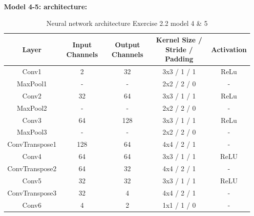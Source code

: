 \documentclass[a4paper,10pt]{article}
\begin{document}
\textbf{Model 4-5: architecture:}


\begin{table}[h]
\centering
\begin{tabular}{|c|c|c|c|c|}
\hline
\textbf{Layer} & \textbf{Input Channels} & \textbf{Output Channels} & \textbf{Kernel Size / Stride / Padding} & \textbf{Activation} \\ \hline
Conv1          & 2                       & 32                       & 3x3 / 1 / 1                             & ReLu                   \\ \hline
MaxPool1       & -                       & -                        & 2x2 / 2 / 0                             & -                   \\ \hline
Conv2          & 32                      & 64                       & 3x3 / 1 / 1                             & ReLu                   \\ \hline
MaxPool2       & -                       & -                        & 2x2 / 2 / 0                             & -                   \\ \hline
Conv3          & 64                      & 128                      & 3x3 / 1 / 1                             & ReLu                   \\ \hline
MaxPool3       & -                       & -                        & 2x2 / 2 / 0                             & -                   \\ \hline
ConvTranspose1 & 128                     & 64                       & 4x4 / 2 / 1                             & -                   \\ \hline
Conv4          & 64                      & 64                       & 3x3 / 1 / 1                             & ReLU                \\ \hline
ConvTranspose2 & 64                      & 32                       & 4x4 / 2 / 1                             & -                   \\ \hline
Conv5          & 32                      & 32                       & 3x3 / 1 / 1                             & ReLU                \\ \hline
ConvTranspose3 & 32                      & 4                        & 4x4 / 2 / 1                             & -                   \\ \hline
Conv6          & 4                       & 2                        & 1x1 / 1 / 0                             & -                   \\ \hline
\end{tabular}
\caption{Neural network architecture Exercise 2.2 model 4 \& 5}
\label{table:architecture_no_bn_v3}
\end{table}
\end{document}
